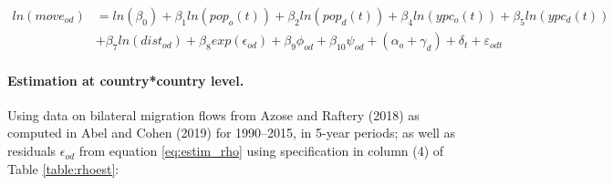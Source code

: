 \documentclass[letterpaper,11pt]{article}
\begin{document}
\begin{align} \label{eq:estim_grav}
	ln(move_{od}) &= ln(\beta_0) + \beta_1 ln(pop_o(t)) + \beta_2 ln(pop_d(t)) + \beta_4  ln(ypc_o(t)) + \beta_5 ln(ypc_d(t)) \nonumber \\
				&+ \beta_7 ln(dist_{od}) + \beta_8 exp(\epsilon_{od}) + \beta_9 \phi_{od} + \beta_{10} \psi_{od} + (\alpha_o + \gamma_d ) + \delta_t + \varepsilon_{odt}
\end{align}


\paragraph{Estimation at country*country level.}
Using data on bilateral migration flows from Azose and Raftery (2018) as computed in Abel and Cohen (2019) for 1990--2015, in 5-year periods; as well as residuals $\epsilon_{od}$ from equation \ref{eq:estim_rho} using specification in column (4) of Table \ref{table:rhoest}:
\end{document}
